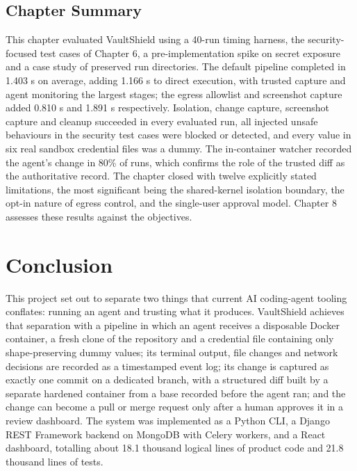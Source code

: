 \documentclass[12pt,a4paper,oneside]{report}
\begin{document}
\section{Chapter Summary}\label{chapter-summary}

This chapter evaluated VaultShield using a 40-run timing harness, the security-focused test cases of Chapter 6, a pre-implementation spike on secret exposure and a case study of preserved run directories. The default pipeline completed in 1.403 s on average, adding 1.166 s to direct execution, with trusted capture and agent monitoring the largest stages; the egress allowlist and screenshot capture added 0.810 s and 1.891 s respectively. Isolation, change capture, screenshot capture and cleanup succeeded in every evaluated run, all injected unsafe behaviours in the security test cases were blocked or detected, and every value in six real sandbox credential files was a dummy. The in-container watcher recorded the agent's change in 80\% of runs, which confirms the role of the trusted diff as the authoritative record. The chapter closed with twelve explicitly stated limitations, the most significant being the shared-kernel isolation boundary, the opt-in nature of egress control, and the single-user approval model. Chapter 8 assesses these results against the objectives.

\clearpage

\chapter{Conclusion}\label{conclusion}

This project set out to separate two things that current AI coding-agent tooling conflates: running an agent and trusting what it produces. VaultShield achieves that separation with a pipeline in which an agent receives a disposable Docker container, a fresh clone of the repository and a credential file containing only shape-preserving dummy values; its terminal output, file changes and network decisions are recorded as a timestamped event log; its change is captured as exactly one commit on a dedicated branch, with a structured diff built by a separate hardened container from a base recorded before the agent ran; and the change can become a pull or merge request only after a human approves it in a review dashboard. The system was implemented as a Python CLI, a Django REST Framework backend on MongoDB with Celery workers, and a React dashboard, totalling about 18.1 thousand logical lines of product code and 21.8 thousand lines of tests.
\end{document}
